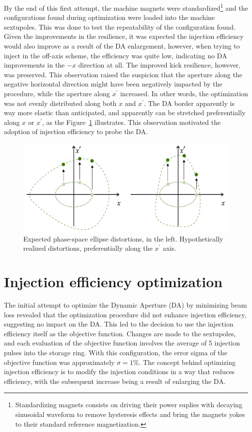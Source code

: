 By the end of this first attempt, the machine magnets were standardized\footnote{Standardizing magnets consists on driving their power suplies with decaying sinusoidal waveform to remove hysteresis effects and bring the magnets yokes to their standard reference magnetization.} and the configurations found during optimization were loaded into the machine sextupoles. This was done to test the repeatability of the configuration found. Given the improvements in the resilience, it was expected the injection efficiency would also improve as a result of the DA enlargement, however, when trying to inject in the off-axis scheme, the efficiency was quite low, indicating no DA improvements in the $-x$ direction at all. The improved kick resilience, however, was preserved. This observation raised the suspicion that the aperture along the negative horizontal direction might have been negatively impacted by the procedure, while the aperture along $x^\prime$ increased. In other words, the optimization was not evenly distributed along both $x$ and $x^\prime$. The DA border apparently is way more elastic than anticipated, and apparently can be stretched preferentially along $x$ or $x^\prime$, as the Figure~\ref{fig:expected_vs_reality_DA} illustrates. This observation motivated the adoption of injection efficiency to probe the DA.
\begin{figure}
    \centering
    \includegraphics[width=\textwidth]{Images/elastic_phase_space_distortion.pdf}
    \caption[Expected phase-space ellipse distortions vs. hypothetically realized distortions.]{Expected phase-space ellipse distortions, in the left. Hypothetically realized distortions, preferentially along the $x^\prime$ axis.}
    \label{fig:expected_vs_reality_DA}
\end{figure}
\section{Injection efficiency optimization}
The initial attempt to optimize the Dynamic Aperture (DA) by minimizing beam loss revealed that the optimization procedure did not enhance injection efficiency, suggesting no impact on the DA. This led to the decision to use the injection efficiency itself as the objective function. Changes are made to the sextupoles, and each evaluation of the objective function involves the average of 5 injection pulses into the storage ring. With this configuration, the error sigma of the objective function was approximately $\sigma=1\%$. The concept behind optimizing injection efficiency is to modify the injection conditions in a way that reduces efficiency, with the subsequent increase being a result of enlarging the DA.

